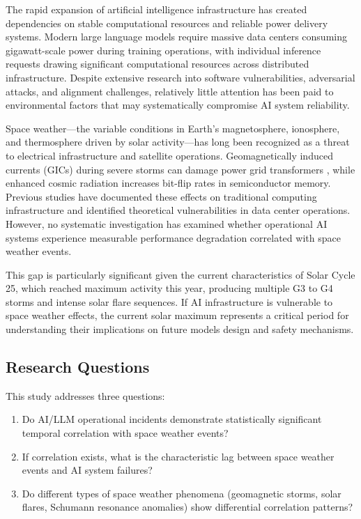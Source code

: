 \documentclass[11pt,a4paper]{article}
\begin{document}
The rapid expansion of artificial intelligence infrastructure has created dependencies on stable computational resources and reliable power delivery systems. Modern large language models require massive data centers consuming gigawatt-scale power during training operations, with individual inference requests drawing significant computational resources across distributed infrastructure. \cite{arxiv_elec} \cite{frontiers} \cite{semi1} \cite{semi2} \cite{semi3} \cite{mit_climate} Despite extensive research into software vulnerabilities, adversarial attacks, and alignment challenges, relatively little attention has been paid to environmental factors that may systematically compromise AI system reliability.

Space weather---the variable conditions in Earth's magnetosphere, ionosphere, and thermosphere driven by solar activity---has long been recognized as a threat to electrical infrastructure and satellite operations. Geomagnetically induced currents (GICs) during severe storms can damage power grid transformers \cite{noaa1} \cite{clou} \cite{wapa}, while enhanced cosmic radiation increases bit-flip rates in semiconductor memory. \cite{baumann} \cite{ti_soft} \cite{ntt} Previous studies have documented these effects on traditional computing infrastructure and identified theoretical vulnerabilities in data center operations. \cite{dck} \cite{dcd} \cite{schneider} \cite{uptime} \cite{nam} However, no systematic investigation has examined whether operational AI systems experience measurable performance degradation correlated with space weather events.

This gap is particularly significant given the current characteristics of Solar Cycle 25, which reached maximum activity this year, producing multiple G3 to G4 storms and intense solar flare sequences. If AI infrastructure is vulnerable to space weather effects, the current solar maximum represents a critical period for understanding their implications on future models design and safety mechanisms.

\subsection{Research Questions}
This study addresses three questions:
\begin{enumerate}
\item Do AI/LLM operational incidents demonstrate statistically significant temporal correlation with space weather events?
\item If correlation exists, what is the characteristic lag between space weather events and AI system failures?
\item Do different types of space weather phenomena (geomagnetic storms, solar flares, Schumann resonance anomalies) show differential correlation patterns?
\end{enumerate}
\end{document}
